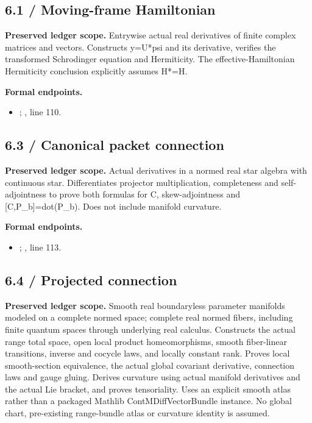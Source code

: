 \subsection{6.1 / Moving-frame Hamiltonian}
\label{result:6.1}
\textbf{Preserved ledger scope.} Entrywise actual real derivatives of finite complex matrices and vectors. Constructs y=U*psi and its derivative, verifies the transformed Schrodinger equation and Hermiticity. The effective-Hamiltonian Hermiticity conclusion explicitly assumes H*=H.

\textbf{Formal endpoints.}\begin{itemize}
\item {}; , line 110.
\end{itemize}
\subsection{6.3 / Canonical packet connection}
\label{result:6.3}
\textbf{Preserved ledger scope.} Actual derivatives in a normed real star algebra with continuous star. Differentiates projector multiplication, completeness and self-adjointness to prove both formulas for C, skew-adjointness and [C,P\_b]=dot(P\_b). Does not include manifold curvature.

\textbf{Formal endpoints.}\begin{itemize}
\item {}; , line 113.
\end{itemize}
\subsection{6.4 / Projected connection}
\label{result:6.4}
\textbf{Preserved ledger scope.} Smooth real boundaryless parameter manifolds modeled on a complete normed space; complete real normed fibers, including finite quantum spaces through underlying real calculus. Constructs the actual range total space, open local product homeomorphisms, smooth fiber-linear transitions, inverse and cocycle laws, and locally constant rank. Proves local smooth-section equivalence, the actual global covariant derivative, connection laws and gauge gluing. Derives curvature using actual manifold derivatives and the actual Lie bracket, and proves tensoriality. Uses an explicit smooth atlas rather than a packaged Mathlib ContMDiffVectorBundle instance. No global chart, pre-existing range-bundle atlas or curvature identity is assumed.

